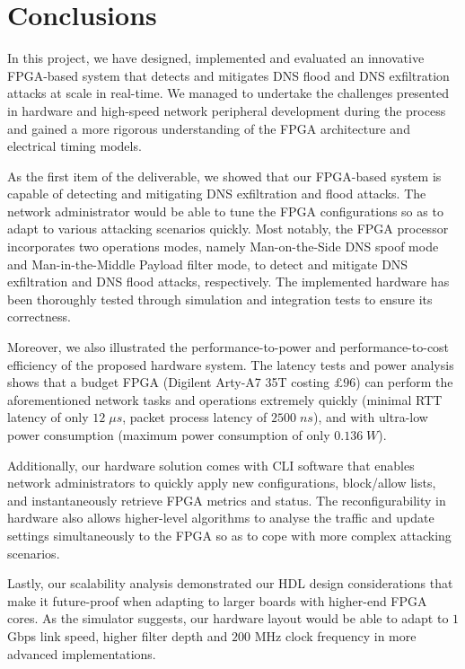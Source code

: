 \documentclass[a4paper]{report}
\begin{document}
\section{Conclusions}
In this project, we have designed, implemented and evaluated an innovative FPGA-based system that detects and mitigates DNS flood and DNS exfiltration attacks at scale in real-time. We managed to undertake the challenges presented in hardware and high-speed network peripheral development during the process and gained a more rigorous understanding of the FPGA architecture and electrical timing models.

As the first item of the deliverable, we showed that our FPGA-based system is capable of detecting and mitigating DNS exfiltration and flood attacks. The network administrator would be able to tune the FPGA configurations so as to adapt to various attacking scenarios quickly. Most notably, the FPGA processor incorporates two operations modes, namely Man-on-the-Side DNS spoof mode and Man-in-the-Middle Payload filter mode, to detect and mitigate DNS exfiltration and DNS flood attacks, respectively. The implemented hardware has been thoroughly tested through simulation and integration tests to ensure its correctness.

Moreover, we also illustrated the performance-to-power and performance-to-cost efficiency of the proposed hardware system. The latency tests and power analysis shows that a budget FPGA (Digilent Arty-A7 35T costing $£96$) can perform the aforementioned network tasks and operations extremely quickly (minimal RTT latency of only $12\; \mu s$, packet process latency of $2500\; ns$), and with ultra-low power consumption (maximum power consumption of only $0.136\; W$). 

Additionally, our hardware solution comes with CLI software that enables network administrators to quickly apply new configurations, block/allow lists, and instantaneously retrieve FPGA metrics and status. The reconfigurability in hardware also allows higher-level algorithms to analyse the traffic and update settings simultaneously to the FPGA so as to cope with more complex attacking scenarios.

Lastly, our scalability analysis demonstrated our HDL design considerations that make it future-proof when adapting to larger boards with higher-end FPGA cores. As the simulator suggests, our hardware layout would be able to adapt to $1$ Gbps link speed, higher filter depth and $200$ MHz clock frequency in more advanced implementations.
\end{document}
